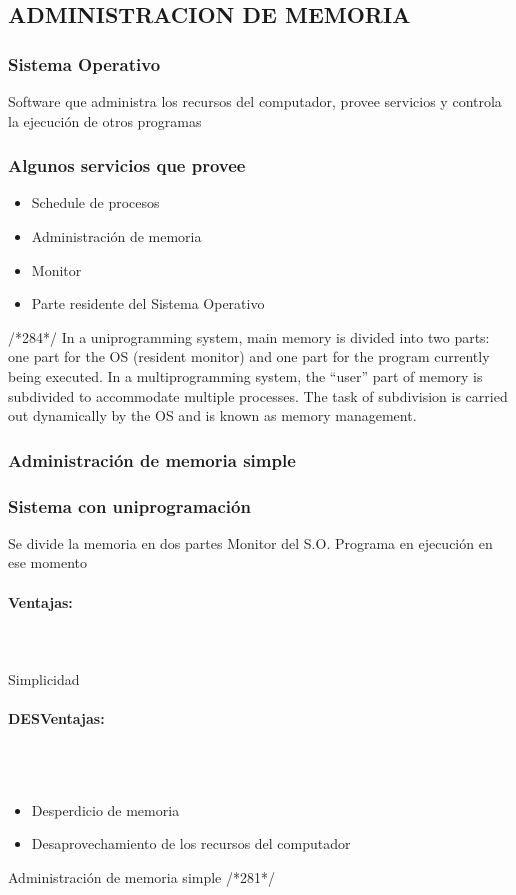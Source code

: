 \subsection{ADMINISTRACION DE MEMORIA }

\subsubsection{Sistema Operativo}
Software que administra los recursos del computador, provee servicios y controla la ejecución de otros programas
\subsubsection{Algunos servicios que provee}
\begin{itemize}
\item Schedule de procesos
\item Administración de memoria
\item Monitor
\item Parte residente del Sistema Operativo
\end{itemize}
/*284*/
In a uniprogramming system, main memory is divided into two parts: one part for
the OS (resident monitor) and one part for the program currently being executed.
In a multiprogramming system, the “user” part of memory is subdivided to accommodate
multiple processes. The task of subdivision is carried out dynamically by the
OS and is known as memory management.

\subsubsection{Administración de memoria simple}
\subsubsection{Sistema con uniprogramación}

Se divide la memoria en dos partes
Monitor del S.O.
Programa en ejecución en ese momento
\paragraph{Ventajas:}\mbox{}\\\\%

Simplicidad

\paragraph{DESVentajas:}\mbox{}\\\\%
\begin{itemize}
\item Desperdicio de memoria
\item Desaprovechamiento de los recursos del computador
\end{itemize}
Administración de memoria simple 
/*281*/

